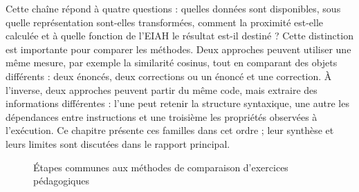 \documentclass[12pt,a4paper,oneside]{report}
\begin{document}
Cette chaîne répond à quatre questions : quelles données sont disponibles,
sous quelle représentation sont-elles transformées, comment la proximité
est-elle calculée et à quelle fonction de l'EIAH le résultat est-il destiné ?
Cette distinction est importante pour comparer les méthodes. Deux approches
peuvent utiliser une même mesure, par exemple la similarité cosinus, tout en
comparant des objets différents : deux énoncés, deux corrections ou un énoncé
et une correction. À l'inverse, deux approches peuvent partir du même code,
mais extraire des informations différentes : l'une peut retenir la structure
syntaxique, une autre les dépendances entre instructions et une troisième les
propriétés observées à l'exécution. Ce chapitre présente ces familles dans cet ordre ; leur
synthèse et leurs limites sont discutées dans le rapport principal.

\begin{figure}[H]
    \centering
    \caption{Étapes communes aux méthodes de comparaison d'exercices pédagogiques}
    \label{fig:pipeline_generique}
\end{figure}
\end{document}
